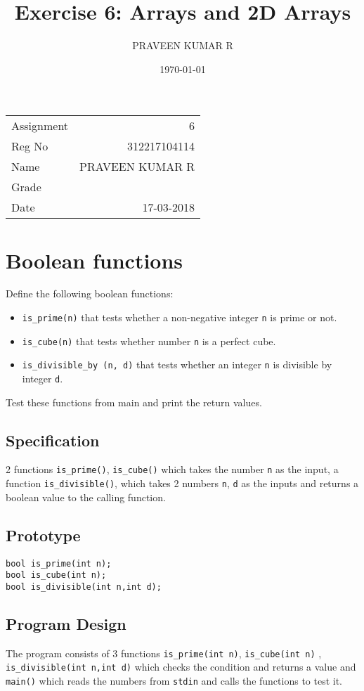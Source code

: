 \documentclass[11pt]{article}
\author{PRAVEEN KUMAR R}
\date{\today}
\title{Exercise 6: Arrays and 2D Arrays}
\begin{document}
\maketitle
\begin{export}
\linespread{1.2}
\end{export}
\begin{center}
\begin{tabular}{lr}
Assignment & 6\\
Reg No & 312217104114\\
Name & PRAVEEN KUMAR R\\
Grade & \\
Date & 17-03-2018\\
\end{tabular}
\end{center}
\linespread{1}
\section{Boolean functions}
\label{sec-1}
Define the following boolean functions:
\begin{itemize}
\item \texttt{is\_prime(n)} that tests whether a non-negative integer
\texttt{n} is prime or not.
\item \texttt{is\_cube(n)} that tests whether number \texttt{n} is a perfect
cube.
\item \texttt{is\_divisible\_by (n, d)} that tests whether an integer \texttt{n}
     is divisible by integer \texttt{d}.
\end{itemize}
Test these functions from main and print the return values.
\subsection{Specification}
\label{sec-1-1}
2 functions \texttt{is\_prime()}, \texttt{is\_cube()} which takes the number \texttt{n} 
as the input, a function \texttt{is\_divisible()}, which takes 2 numbers
\texttt{n}, \texttt{d} as the inputs and returns a boolean value to the calling
function.
\subsection{Prototype}
\label{sec-1-2}
\begin{verbatim}
bool is_prime(int n);
bool is_cube(int n);
bool is_divisible(int n,int d);
\end{verbatim}
\subsection{Program Design}
\label{sec-1-3}
The program consists of 3 functions \texttt{is\_prime(int n)}, \texttt{is\_cube(int n)}
, \texttt{is\_divisible(int n,int d)} which checks the condition and returns a 
value and \texttt{main()} which reads the numbers from \texttt{stdin} and calls the
functions to test it.
\end{document}
